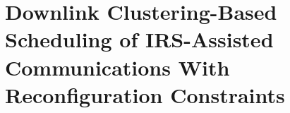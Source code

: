 







\chapter{Downlink Clustering-Based Scheduling of IRS-Assisted Communications With Reconfiguration Constraints}
\label{sec:introduction}


